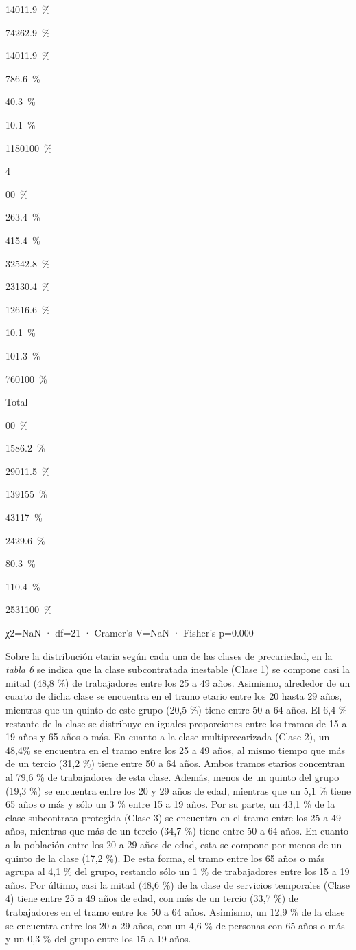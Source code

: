 \documentclass[
]{article}
\begin{document}
{140}{11.9~\%}

{742}{62.9~\%}

{140}{11.9~\%}

{78}{6.6~\%}

{4}{0.3~\%}

{1}{0.1~\%}

{1180}{100~\%}

4

{0}{0~\%}

{26}{3.4~\%}

{41}{5.4~\%}

{325}{42.8~\%}

{231}{30.4~\%}

{126}{16.6~\%}

{1}{0.1~\%}

{10}{1.3~\%}

{760}{100~\%}

Total

{0}{0~\%}

{158}{6.2~\%}

{290}{11.5~\%}

{1391}{55~\%}

{431}{17~\%}

{242}{9.6~\%}

{8}{0.3~\%}

{11}{0.4~\%}

{2531}{100~\%}

χ2=NaN · df=21 · Cramer's V=NaN · Fisher's p=0.000

Sobre la distribución etaria según cada una de las clases de
precariedad, en la \emph{tabla 6} se indica que la clase subcontratada
inestable (Clase 1) se compone casi la mitad (48,8 \%) de trabajadores
entre los 25 a 49 años. Asimismo, alrededor de un cuarto de dicha clase
se encuentra en el tramo etario entre los 20 hasta 29 años, mientras que
un quinto de este grupo (20,5 \%) tiene entre 50 a 64 años. El 6,4 \%
restante de la clase se distribuye en iguales proporciones entre los
tramos de 15 a 19 años y 65 años o más. En cuanto a la clase
multiprecarizada (Clase 2), un 48,4\% se encuentra en el tramo entre los
25 a 49 años, al mismo tiempo que más de un tercio (31,2 \%) tiene entre
50 a 64 años. Ambos tramos etarios concentran al 79,6 \% de trabajadores
de esta clase. Además, menos de un quinto del grupo (19,3 \%) se
encuentra entre los 20 y 29 años de edad, mientras que un 5,1 \% tiene
65 años o más y sólo un 3 \% entre 15 a 19 años. Por su parte, un 43,1
\% de la clase subcontrata protegida (Clase 3) se encuentra en el tramo
entre los 25 a 49 años, mientras que más de un tercio (34,7 \%) tiene
entre 50 a 64 años. En cuanto a la población entre los 20 a 29 años de
edad, esta se compone por menos de un quinto de la clase (17,2 \%). De
esta forma, el tramo entre los 65 años o más agrupa al 4,1 \% del grupo,
restando sólo un 1 \% de trabajadores entre los 15 a 19 años. Por
último, casi la mitad (48,6 \%) de la clase de servicios temporales
(Clase 4) tiene entre 25 a 49 años de edad, con más de un tercio (33,7
\%) de trabajadores en el tramo entre los 50 a 64 años. Asimismo, un
12,9 \% de la clase se encuentra entre los 20 a 29 años, con un 4,6 \%
de personas con 65 años o más y un 0,3 \% del grupo entre los 15 a 19
años.
\end{document}
